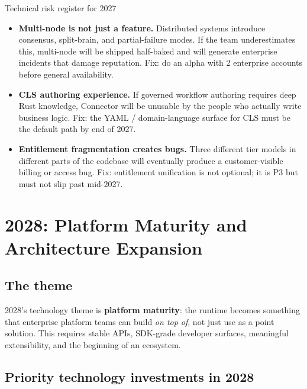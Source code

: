\begin{warnbox}{Technical risk register for 2027}
\begin{itemize}[noitemsep,leftmargin=1.4em]
  \item \textbf{Multi-node is not just a feature.} Distributed systems introduce
        consensus, split-brain, and partial-failure modes. If the team underestimates
        this, multi-node will be shipped half-baked and will generate enterprise
        incidents that damage reputation. Fix: do an alpha with 2 enterprise accounts
        before general availability.
  \item \textbf{CLS authoring experience.} If governed workflow authoring requires
        deep Rust knowledge, Connector will be unusable by the people who actually
        write business logic. Fix: the YAML / domain-language surface for CLS
        must be the default path by end of 2027.
  \item \textbf{Entitlement fragmentation creates bugs.} Three different tier models
        in different parts of the codebase will eventually produce a customer-visible
        billing or access bug. Fix: entitlement unification is not optional; it is
        P3 but must not slip past mid-2027.
\end{itemize}
\end{warnbox}

\section{2028: Platform Maturity and Architecture Expansion}

\subsection{The theme}

2028's technology theme is \textbf{platform maturity}: the runtime becomes
something that enterprise platform teams can build \textit{on top of}, not just
use as a point solution. This requires stable APIs, SDK-grade developer
surfaces, meaningful extensibility, and the beginning of an ecosystem.

\subsection{Priority technology investments in 2028}

